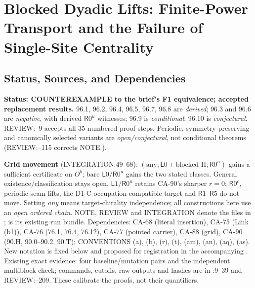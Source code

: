 \section{Blocked Dyadic Lifts: Finite-Power Transport and the Failure of Single-Site Centrality}\label{sec:blocked-dyadic-lifts}

\subsection{Status, Sources, and Dependencies}

\textbf{Status: COUNTEREXAMPLE to the brief's F1 equivalence; accepted replacement results.}
96.1, 96.2, 96.4, 96.5, 96.7, 96.8 are \emph{derived}; 96.3 and 96.6 are \emph{negative}, with derived
\(\mathsf R0^u\) witnesses; 96.9 is \emph{conditional}; 96.10 is \emph{conjectural}.
REVIEW:--9 accepts all 35 numbered proof steps. Periodic, symmetry-preserving and canonically selected variants
are \emph{open/conjectural}, not conditional theorems (REVIEW:--115 corrects NOTE:).
\par\textbf{Grid movement} (INTEGRATION:49--68): \((\mathrm{any};\mathsf L0+\text{blocked H};\mathsf R0^u)\) gains a
sufficient certificate on \(O^b\); bare \(\mathsf L0/\mathsf R0^u\) gains the two stated classes.
General existence/classification stays open. \(\mathsf L1/\mathsf R0^u\) retains CA-90's sharper \(r=0\);
\(\mathsf R0^c\), periodic-seam lifts, the D1-C occupation-compatible target and \(\mathsf R1\)--\(\mathsf R5\) do not move.
Setting \emph{any} means target-chirality independence; all constructions here use an \emph{open ordered chain}.
NOTE, REVIEW and INTEGRATION denote the files in
;  is its existing run bundle.
Dependencies: CA-68 (literal insertion), CA-75 (Link (b1)), CA-76 (76.1, 76.4, 76.12), CA-77 (pointed carrier),
CA-88 (grid), CA-90 (90.H, 90.0--90.2, 90.T); CONVENTIONS (a), (b), (r), (t), (am), (an), (aq), (as).
New notation is fixed below and proposed for registration in the accompanying .
Existing exact evidence: four baseline/mutation pairs and the independent multiblock check; commands, cutoffs,
raw outputs and hashes are in :9--39 and REVIEW:--209. These calibrate the proofs, not their quantifiers.

